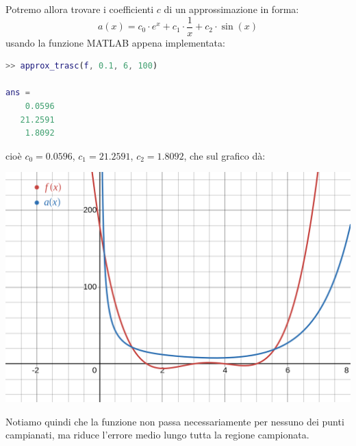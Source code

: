 \documentclass[a4paper,11pt]{article}
\begin{document}
Potremo allora trovare i coefficienti $c$ di un approssimazione in forma:
$$
a(x) = c_{0}\cdot e^{x}+c_{1}\cdot\frac{1}{x}+c_{2}\cdot\sin\left(x\right)
$$
usando la funzione MATLAB appena implementata:
\begin{lstlisting}[language=matlab, style=codestyle]	
>> approx_trasc(f, 0.1, 6, 100)

ans =
    0.0596
   21.2591
    1.8092
\end{lstlisting}
cioè $c_0 = 0.0596$, $c_1 = 21.2591$, $c_2 = 1.8092$, che sul grafico dà:
\begin{center}
	\includegraphics[scale = 0.28]{../figures/trasc_approx.png}
\end{center}

Notiamo quindi che la funzione non passa necessariamente per nessuno dei punti campianati, ma riduce l'errore medio lungo tutta la regione campionata.
\end{document}
